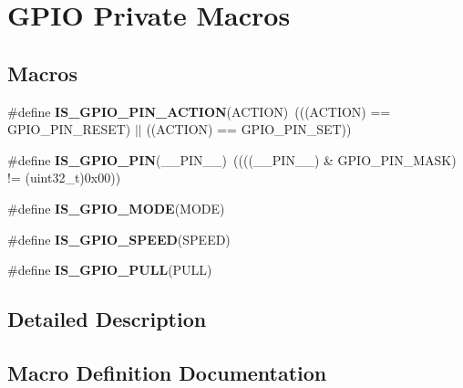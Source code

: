 \hypertarget{group___g_p_i_o___private___macros}{}\section{G\+P\+IO Private Macros}
\label{group___g_p_i_o___private___macros}
\subsection*{Macros}
\begin{DoxyCompactItemize}
\item 
\mbox{\label{group___g_p_i_o___private___macros_ga6da646a4924c5cfae3024c660476f26f}} 
\#define {\bfseries I\+S\+\_\+\+G\+P\+I\+O\+\_\+\+P\+I\+N\+\_\+\+A\+C\+T\+I\+ON}(A\+C\+T\+I\+ON)~(((A\+C\+T\+I\+ON) == G\+P\+I\+O\+\_\+\+P\+I\+N\+\_\+\+R\+E\+S\+ET) $\vert$$\vert$ ((A\+C\+T\+I\+ON) == G\+P\+I\+O\+\_\+\+P\+I\+N\+\_\+\+S\+ET))
\item 
\mbox{\label{group___g_p_i_o___private___macros_ga4911823233fa2bf64a4f04c6dbfa5485}} 
\#define {\bfseries I\+S\+\_\+\+G\+P\+I\+O\+\_\+\+P\+IN}(\+\_\+\+\_\+\+P\+I\+N\+\_\+\+\_\+)~((((\+\_\+\+\_\+\+P\+I\+N\+\_\+\+\_\+) \& G\+P\+I\+O\+\_\+\+P\+I\+N\+\_\+\+M\+A\+SK) != (uint32\+\_\+t)0x00))
\item 
\#define {\bfseries I\+S\+\_\+\+G\+P\+I\+O\+\_\+\+M\+O\+DE}(M\+O\+DE)
\item 
\#define {\bfseries I\+S\+\_\+\+G\+P\+I\+O\+\_\+\+S\+P\+E\+ED}(S\+P\+E\+ED)
\item 
\#define {\bfseries I\+S\+\_\+\+G\+P\+I\+O\+\_\+\+P\+U\+LL}(P\+U\+LL)
\end{DoxyCompactItemize}


\subsection{Detailed Description}


\subsection{Macro Definition Documentation}
\mbox{\label{group___g_p_i_o___private___macros_gacc5fde3eef57ec3c558c11d0011d900c}} 

